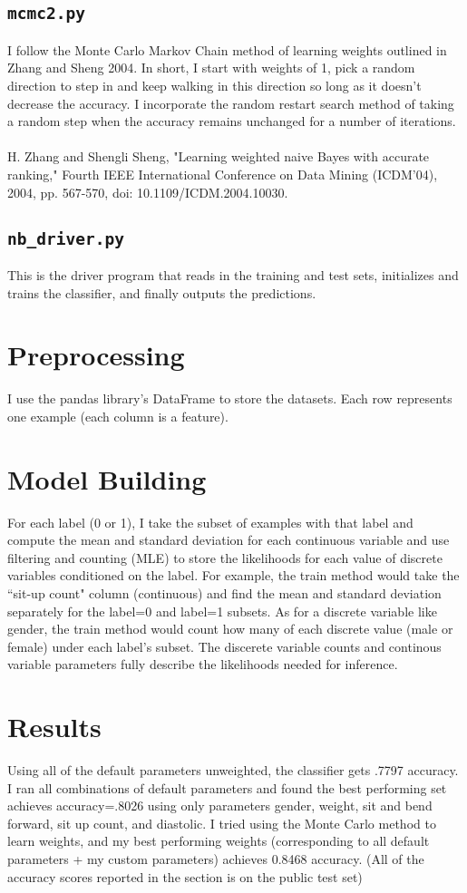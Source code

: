 \documentclass{article}
\begin{document}
\subsection{\texttt{mcmc2.py}}
I follow the Monte Carlo Markov Chain method of learning weights outlined in Zhang and Sheng 2004. In short, I start with weights of 1, pick a random direction to step in and keep walking in this direction so long as it doesn't decrease the accuracy. I incorporate the random restart search method of taking a random step when the accuracy remains unchanged for a number of iterations.
\\\\
\noindent H. Zhang and Shengli Sheng, "Learning weighted naive Bayes with accurate ranking," Fourth IEEE International Conference on Data Mining (ICDM'04), 2004, pp. 567-570, doi: 10.1109/ICDM.2004.10030.
\subsection{\texttt{nb\_driver.py}}
This is the driver program that reads in the training and test sets, initializes and trains the classifier, and finally outputs the predictions.
\section{Preprocessing}
I use the pandas library's DataFrame to store the datasets. Each row represents one example (each column is a feature).
\section{Model Building}
For each label (0 or 1), I take the subset of examples with that label and compute the mean and standard deviation for each continuous variable and use filtering and counting (MLE) to store the likelihoods for each value of discrete variables conditioned on the label. For example, the train method would take the ``sit-up count" column (continuous) and find the mean and standard deviation separately for the label=0 and label=1 subsets. As for a discrete variable like gender, the train method would count how many of each discrete value (male or female) under each label's subset. The discerete variable counts and continous variable parameters fully describe the likelihoods needed for inference.
\section{Results}
Using all of the default parameters unweighted, the classifier gets .7797 accuracy. I ran all combinations of default parameters and found the best performing set achieves accuracy=.8026 using only parameters gender, weight, sit and bend forward, sit up count, and diastolic. I tried using the Monte Carlo method to learn weights, and my best performing weights (corresponding to all default parameters + my custom parameters) achieves 0.8468 accuracy. (All of the accuracy scores reported in the section is on the public test set)
\end{document}
